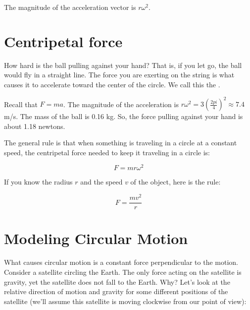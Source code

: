 
The magnitude of the acceleration vector is $r \omega^2$.

\section{Centripetal force}

How hard is the ball pulling against your hand?  That is, if you let
go, the ball would fly in a straight line.  The force you are exerting
on the string is what causes it to accelerate toward the center of the
circle. We call this the .

Recall that $F = m a$.  The magnitude of the acceleration is $r
\omega^2 = 3 \left(\frac{2 pi}{4}\right)^2 \approx 7.4$ m/s.  The mass
of the ball is 0.16 kg.  So, the force pulling against your hand is
about 1.18 newtons.

The general rule is that when something is traveling in a circle at a
constant speed, the centripetal force needed to keep it traveling in a
circle is:

$$F = m r \omega^2$$

If you know the radius $r$ and the speed $v$ of the object, here is the rule:

$$F = \frac{m v^2}{r}$$

\section{Modeling Circular Motion}
What causes circular motion is a constant force perpendicular to the motion. Consider a satellite circling the Earth. The only force acting on the satellite is gravity, yet the satellite does not fall to the Earth. Why? Let's look at the relative direction of motion and gravity for some different positions of the satellite (we'll assume this satellite is moving clockwise from our point of view):

